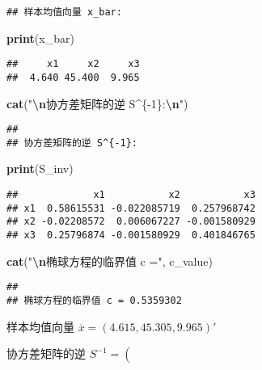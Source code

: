 \documentclass[
]{ctexart}
\newenvironment{Shaded}{\begin{snugshade}}{\end{snugshade}}
\newcommand{\FunctionTok}[1]{\textcolor[rgb]{0.13,0.29,0.53}{\textbf{#1}}}
\newcommand{\NormalTok}[1]{#1}
\newcommand{\SpecialCharTok}[1]{\textcolor[rgb]{0.81,0.36,0.00}{\textbf{#1}}}
\newcommand{\StringTok}[1]{\textcolor[rgb]{0.31,0.60,0.02}{#1}}
\begin{document}
\begin{verbatim}
## 样本均值向量 x_bar:
\end{verbatim}

\begin{Shaded}
\begin{Highlighting}[]
\FunctionTok{print}\NormalTok{(x\_bar)}
\end{Highlighting}
\end{Shaded}

\begin{verbatim}
##     x1     x2     x3 
##  4.640 45.400  9.965
\end{verbatim}

\begin{Shaded}
\begin{Highlighting}[]
\FunctionTok{cat}\NormalTok{(}\StringTok{"}\SpecialCharTok{\textbackslash{}n}\StringTok{协方差矩阵的逆 S\^{}\{{-}1\}:}\SpecialCharTok{\textbackslash{}n}\StringTok{"}\NormalTok{)}
\end{Highlighting}
\end{Shaded}

\begin{verbatim}
## 
## 协方差矩阵的逆 S^{-1}:
\end{verbatim}

\begin{Shaded}
\begin{Highlighting}[]
\FunctionTok{print}\NormalTok{(S\_inv)}
\end{Highlighting}
\end{Shaded}

\begin{verbatim}
##             x1           x2           x3
## x1  0.58615531 -0.022085719  0.257968742
## x2 -0.02208572  0.006067227 -0.001580929
## x3  0.25796874 -0.001580929  0.401846765
\end{verbatim}

\begin{Shaded}
\begin{Highlighting}[]
\FunctionTok{cat}\NormalTok{(}\StringTok{"}\SpecialCharTok{\textbackslash{}n}\StringTok{椭球方程的临界值 c ="}\NormalTok{, c\_value)}
\end{Highlighting}
\end{Shaded}

\begin{verbatim}
## 
## 椭球方程的临界值 c = 0.5359302
\end{verbatim}

样本均值向量 \(\overline{x}=(4.615,45.305,9.965)'\)

协方差矩阵的逆 \(S^{-1}=\left(\)
\end{document}
